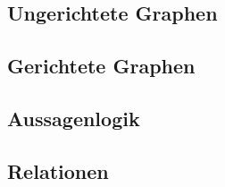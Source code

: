 \documentclass[10pt,a4paper]{article}
\begin{document}
\subsection{Ungerichtete Graphen}



\subsection{Gerichtete Graphen}



\subsection{Aussagenlogik}


\subsection{Relationen}
\end{document}
